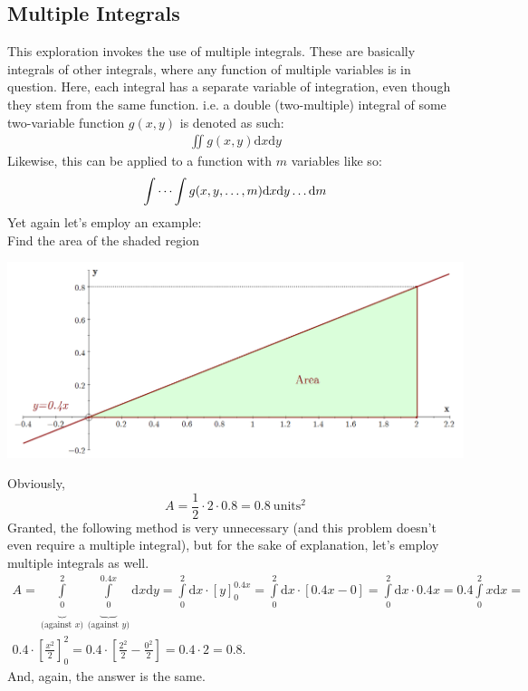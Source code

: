 \subsection{Multiple Integrals} \label{multiint}
This exploration invokes the use of multiple integrals. These are basically integrals of other integrals, where any function of multiple variables is in question. \cite{stewart_2008_int} Here, each integral has a separate variable of integration, even though they stem from the same function. i.e. a double (two-multiple) integral of some two-variable function $g(x,y)$ is denoted as such:
\begin{gather*}
\iint g(x,y) \mathrm{d}x\mathrm{d}y
\end{gather*}
Likewise, this can be applied to a function with $m$ variables like so:
\begin{gather*}
\idotsint g(x,y,\dots,m) \mathrm{d}x\mathrm{d}y \dots \mathrm{d}m
\end{gather*}
Yet again let's employ an example: \\
Find the area of the shaded region\\
\begin{center}
\includegraphics[scale=0.25]{updated/int}
\end{center}
Obviously, $$A=\frac{1}{2}\cdot 2 \cdot 0.8 = 0.8 \ \text{units}^{2}$$ Granted, the following method is very unnecessary (and this problem doesn't even require a multiple integral), but for the sake of explanation, let's employ multiple integrals as well.
\begin{gather*}
A = \underbrace{\int\limits_{0}^{2}}_{\text{(against } x\text{)}} \underbrace{\int\limits_{0}^{0.4x}}_{\text{(against } y\text{)}} \mathrm{d}x \mathrm{d}y =  \int\limits_{0}^{2} \mathrm{d}x \cdot \left[ y \right]_{0}^{0.4x} =  \int\limits_{0}^{2} \mathrm{d}x \cdot  \left[ 0.4x - 0 \right] = \int\limits_{0}^{2} \mathrm{d}x \cdot 0.4x = 0.4 \int\limits_{0}^{2} x\mathrm{d}x = \\
0.4 \cdot \left[ \frac{x^{2}}{2} \right]_{0}^{2} = 0.4 \cdot \left[ \frac{2^{2}}{2} - \frac{0^{2}}{2} \right] = 0.4 \cdot 2 = 0.8.
\end{gather*}
And, again, the answer is the same.
